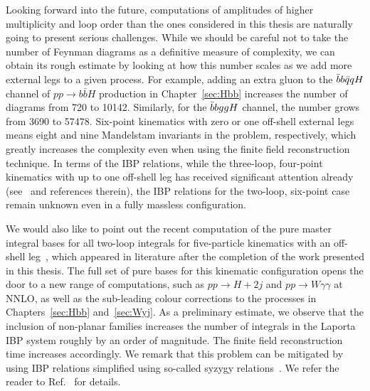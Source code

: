 \documentclass[main.tex]{subfiles}
\begin{document}
Looking forward into the future, computations of amplitudes of higher multiplicity and loop order than the ones considered in this thesis are naturally going to present serious challenges. While we should be careful not to take the number of Feynman diagrams as a definitive measure of complexity, we can obtain its rough estimate by looking at how this number scales as we add more external legs to a given process. For example, adding an extra gluon to the $\bar{b}b\bar{q}qH$ channel of $pp\to b\bar{b}H$ production in Chapter~\ref{sec:Hbb} increases the number of diagrams from 720 to 10142. Similarly, for the $\bar{b}bggH$ channel, the number grows from 3690 to 57478. Six-point kinematics with zero or one off-shell external legs means eight and nine Mandelstam invariants in the problem, respectively, which greatly increases the complexity even when using the finite field reconstruction technique. In terms of the IBP relations, while the three-loop, four-point kinematics with up to one off-shell leg has received significant attention already (see~\cite{Canko:2023yoe} and references therein), the IBP relations for the two-loop, six-point case remain unknown even in a fully massless configuration.

We would also like to point out the recent computation of the pure master integral bases for all two-loop integrals for five-particle kinematics with an off-shell leg~\cite{Abreu:2023rco}, which appeared in literature after the completion of the work presented in this thesis. The full set of pure bases for this kinematic configuration opens the door to a new range of computations, such as $pp \rightarrow H+2j$ and $pp \rightarrow W \gamma \gamma $ at NNLO, as well as the sub-leading colour corrections to the processes in Chapters~\ref{sec:Hbb} and~\ref{sec:Wyj}. As a preliminary estimate, we observe that the inclusion of non-planar families increases the number of integrals in the Laporta IBP system roughly by an order of magnitude. The finite field reconstruction time increases accordingly. We remark that this problem can be mitigated by using IBP relations simplified using so-called syzygy relations~\cite{Gluza:2010ws, 10.1145/1993886.1993902, Schabinger:2011dz, Chen:2015lyz, Bohm:2017qme, Bosma:2018mtf, Boehm:2020zig}. We refer the reader to Ref.~\cite{Wu:2023upw} for details.
\end{document}
